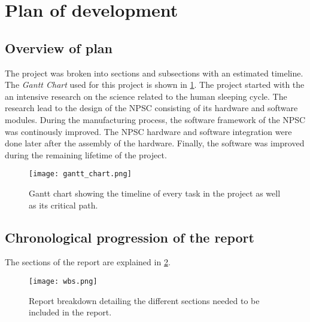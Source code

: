 \section{Plan of development}

\subsection{Overview of plan}
The project was broken into sections and subsections with an estimated timeline.\\
The \textit{Gantt Chart} used for this project is shown in \cref{fig:gant}. The project started with the an intensive research on the science related to the human sleeping cycle. The research lead to the design of the NPSC consisting of its hardware and software modules. During the manufacturing process, the software framework of the NPSC was continously improved. The NPSC hardware and software integration were done later after the assembly of the hardware. Finally, the software was improved during the remaining lifetime of the project.
\begin{landscape}
	\begin{figure}[ht]
		\centering
		\texttt{[image: gantt\_chart.png]}
		\caption{Gantt chart showing the timeline of every task in the project as well as its critical path.}
		\label{fig:gant}
	\end{figure}
\end{landscape}

\subsection{Chronological progression of the report}
The sections of the report are explained in \cref{fig:wbs}.
\begin{figure}[ht]
\centering
\texttt{[image: wbs.png]}
\caption{Report breakdown detailing the different sections needed to be included in the report.}
\label{fig:wbs}
\end{figure}

